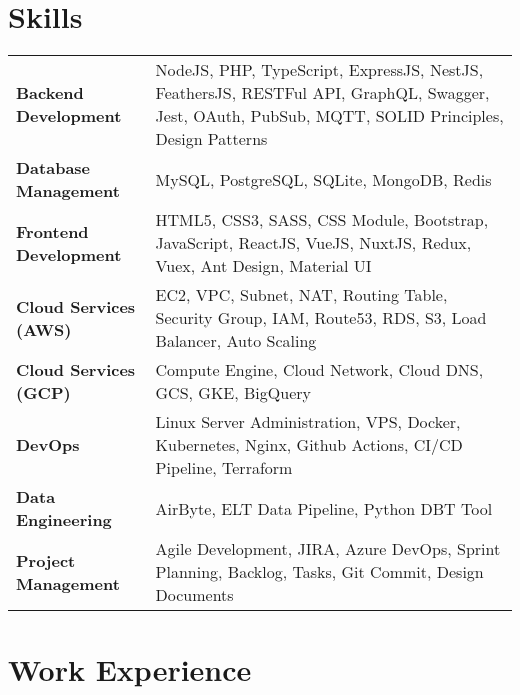 \documentclass {article}
\begin{document}
\section{Skills}
\begin{tabularx}{\linewidth}{@{}l X@{}}
  \textbf{Backend Development} & NodeJS, PHP, TypeScript, ExpressJS, NestJS, FeathersJS, RESTFul API, GraphQL, Swagger, Jest, OAuth, PubSub, MQTT, SOLID Principles, Design Patterns\\
  \textbf{Database Management} & MySQL, PostgreSQL, SQLite, MongoDB, Redis\\ 
  \textbf{Frontend Development} & HTML5, CSS3, SASS, CSS Module, Bootstrap, JavaScript, ReactJS, VueJS, NuxtJS, Redux, Vuex, Ant Design, Material UI\\ 
  \textbf{Cloud Services (AWS)} & EC2, VPC, Subnet, NAT, Routing Table, Security Group, IAM, Route53, RDS, S3, Load Balancer, Auto Scaling\\ 
  \textbf{Cloud Services (GCP)} & Compute Engine, Cloud Network, Cloud DNS, GCS, GKE, BigQuery\\
  \textbf{DevOps} & Linux Server Administration, VPS, Docker, Kubernetes, Nginx, Github Actions, CI/CD Pipeline, Terraform\\
  \textbf{Data Engineering} & AirByte, ELT Data Pipeline, Python DBT Tool\\
  \textbf{Project Management} & Agile Development, JIRA, Azure DevOps, Sprint Planning, Backlog, Tasks, Git Commit, Design Documents\\
\end{tabularx}

\section{Work Experience}
\end{document}

